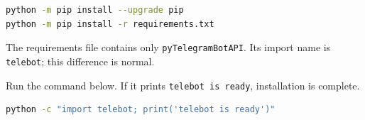 \begin{lstlisting}[language=bash,numbers=none]
python -m pip install --upgrade pip
python -m pip install -r requirements.txt
\end{lstlisting}

The requirements file contains only \texttt{pyTelegramBotAPI}. Its import name is
\texttt{telebot}; this difference is normal.

\begin{checkpointbox}
Run the command below. If it prints \texttt{telebot is ready}, installation is complete.
\begin{lstlisting}[language=bash,numbers=none]
python -c "import telebot; print('telebot is ready')"
\end{lstlisting}
\end{checkpointbox}
